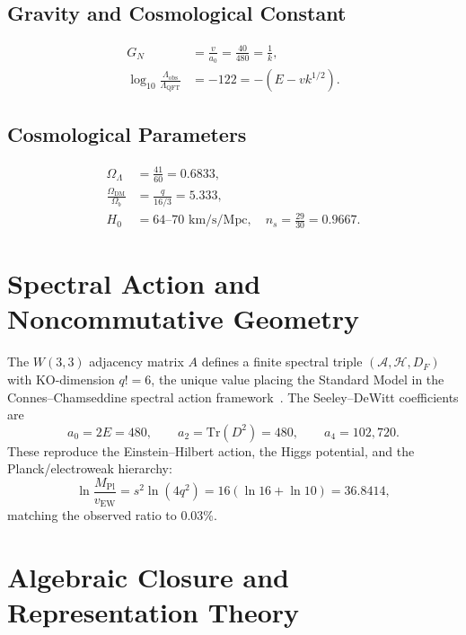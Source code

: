 \documentclass[12pt,a4paper]{article}
\begin{document}
\subsection{Gravity and Cosmological Constant}
\begin{align}
  G_N &= \frac{v}{a_0} = \frac{40}{480} = \frac{1}{k},\\
  \log_{10}\frac{\Lambda_{\mathrm{obs}}}{\Lambda_{\mathrm{QFT}}}
    &= -122 = -(E - vk^{1/2}).
\end{align}

\subsection{Cosmological Parameters}
\begin{align}
  \Omega_\Lambda &= \frac{41}{60} = 0.6833,\\
  \frac{\Omega_{\mathrm{DM}}}{\Omega_b} &= \frac{q}{16/3} = 5.333,\\
  H_0 &= 64\text{--}70\text{ km/s/Mpc},\quad n_s = \frac{29}{30} = 0.9667.
\end{align}

\section{Spectral Action and Noncommutative Geometry}

The $W(3,3)$ adjacency matrix $A$ defines a finite spectral triple
$(\mathcal{A}, \mathcal{H}, D_F)$ with KO-dimension $q! = 6$, the unique
value placing the Standard Model in the Connes--Chamseddine spectral action
framework~\cite{ConnesChamseddine1997}. The Seeley--DeWitt coefficients are
\begin{equation}
  a_0 = 2E = 480,\qquad a_2 = \mathrm{Tr}(D^2) = 480,\qquad a_4 = 102{,}720.
\end{equation}
These reproduce the Einstein--Hilbert action, the Higgs potential, and the
Planck/electroweak hierarchy:
\begin{equation}
  \ln\frac{M_{\mathrm{Pl}}}{v_{\mathrm{EW}}} = s^2\ln(4q^2)
  = 16(\ln 16 + \ln 10) = 36.8414,
\end{equation}
matching the observed ratio to 0.03\%.

\section{Algebraic Closure and Representation Theory}
\end{document}
